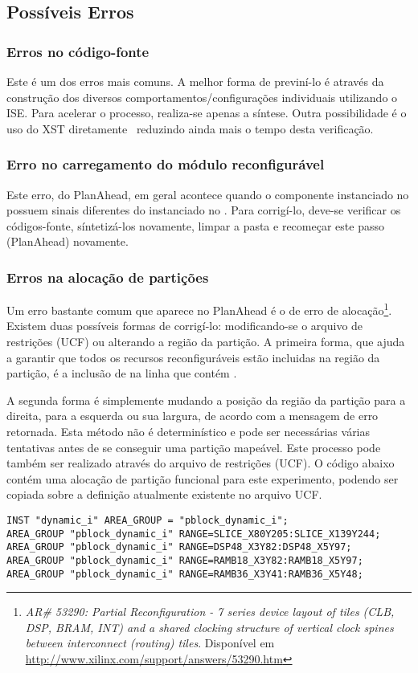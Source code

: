 \documentclass[11pt,a4paper,oneside]{book}
\begin{document}
\subsection{Possíveis Erros}
\subsubsection{Erros no código-fonte} Este é um dos erros mais comuns.
A melhor forma de previní-lo é através da construção dos diversos comportamentos/configurações individuais utilizando o ISE.
Para acelerar o processo, realiza-se apenas a síntese.
Outra possibilidade é o uso do XST diretamente \, reduzindo ainda mais o tempo desta verificação. 

\subsubsection{Erro no carregamento do módulo reconfigurável}
Este erro, do PlanAhead, em geral acontece quando o componente instanciado no  possuem sinais diferentes do instanciado no .
Para corrigí-lo, deve-se verificar os códigos-fonte, síntetizá-los novamente, limpar a pasta  e recomeçar este passo (PlanAhead) novamente.

\subsubsection{Erros na alocação de partições}
\label{par:alocacao}
Um erro bastante comum que aparece no PlanAhead é o de erro de alocação\footnote{\textit{AR\# 53290: Partial Reconfiguration - 7 series device layout of tiles (CLB, DSP, BRAM, INT) and a shared clocking structure of vertical clock spines between interconnect (routing) tiles}. Disponível em \url{http://www.xilinx.com/support/answers/53290.htm}}.
Existem duas possíveis formas de corrigí-lo: modificando-se o arquivo de restrições (UCF) ou alterando a região da partição.
A primeira forma, que ajuda a garantir que todos os recursos reconfiguráveis estão incluidas na região da partição, é a inclusão de  na linha que contém .

A segunda forma é simplemente mudando a posição da região da partição para a direita, para a esquerda ou sua largura, de acordo com a mensagem de erro retornada.
Esta método não é determinístico e pode ser necessárias várias tentativas antes de se conseguir uma partição mapeável. 
Este processo pode também ser realizado através do arquivo de restrições (UCF).
O código abaixo contém uma alocação de partição funcional para este experimento, podendo ser copiada sobre a definição atualmente existente no arquivo UCF.
\begin{lstlisting}
INST "dynamic_i" AREA_GROUP = "pblock_dynamic_i";
AREA_GROUP "pblock_dynamic_i" RANGE=SLICE_X80Y205:SLICE_X139Y244;
AREA_GROUP "pblock_dynamic_i" RANGE=DSP48_X3Y82:DSP48_X5Y97;
AREA_GROUP "pblock_dynamic_i" RANGE=RAMB18_X3Y82:RAMB18_X5Y97;
AREA_GROUP "pblock_dynamic_i" RANGE=RAMB36_X3Y41:RAMB36_X5Y48;
\end{lstlisting}
\end{document}
